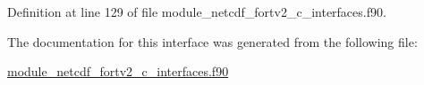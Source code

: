 Definition at line 129 of file module\+\_\+netcdf\+\_\+fortv2\+\_\+c\+\_\+interfaces.\+f90.



The documentation for this interface was generated from the following file\+:\begin{DoxyCompactItemize}
\item 
\hyperlink{module__netcdf__fortv2__c__interfaces_8f90}{module\+\_\+netcdf\+\_\+fortv2\+\_\+c\+\_\+interfaces.\+f90}\end{DoxyCompactItemize}
